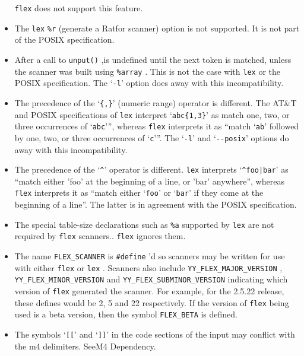 \documentclass[openany,oneside]{book}
\begin{document}
\begin{itemize}
 \verb`flex` does not support this feature.
\item The \verb`lex`  \verb`%r` (generate a Ratfor scanner) option is not
supported.  It is not part of the POSIX specification.
\item After a call to \verb`unput()` ,is undefined until the
next token is matched, unless the scanner was built using \verb`%array` . 
This is not the case with \verb`lex` or the POSIX specification.  The
‘\verb`-l`’ option does away with this incompatibility.
\item The precedence of the ‘\verb`{,}`’ (numeric range) operator is
different.  The AT\&{}T and POSIX specifications of \verb`lex` interpret ‘\verb`abc{1,3}`’ as match one, two,
or three occurrences of ‘\verb`abc`’”, whereas \verb`flex` interprets it
as “match ‘\verb`ab`’ followed by one, two, or three occurrences of
‘\verb`c`’”.  The ‘\verb`-l`’ and ‘\verb`--posix`’ options do away with this
incompatibility.
\item The precedence of the ‘\verb`^`’ operator is different. \verb`lex` interprets ‘\verb`^foo|bar`’ as “match either 'foo' at the beginning of a
line, or 'bar' anywhere”, whereas \verb`flex` interprets it as “match
either ‘\verb`foo`’ or ‘\verb`bar`’ if they come at the beginning of a
line”.  The latter is in agreement with the POSIX specification.
\item The special table-size declarations such as \verb`%a` supported by \verb`lex` are not required by \verb`flex` scanners.. \verb`flex` ignores them.
\item The name \verb`FLEX_SCANNER` is \verb`#define` 'd so scanners may be
written for use with either \verb`flex` or \verb`lex` .  Scanners also
include \verb`YY_FLEX_MAJOR_VERSION` , \verb`YY_FLEX_MINOR_VERSION` and \verb`YY_FLEX_SUBMINOR_VERSION` indicating which version of \verb`flex` generated the scanner. For
example, for the 2.5.22 release, these defines would be 2,  5 and 22
respectively. If the version of \verb`flex` being used is a beta
version, then the symbol \verb`FLEX_BETA` is defined.
\item The symbols ‘\verb`[[`’ and ‘\verb`]]`’ in the code sections of the input
may conflict with the m4 delimiters. SeeM4 Dependency.
\end{itemize}
\end{document}
